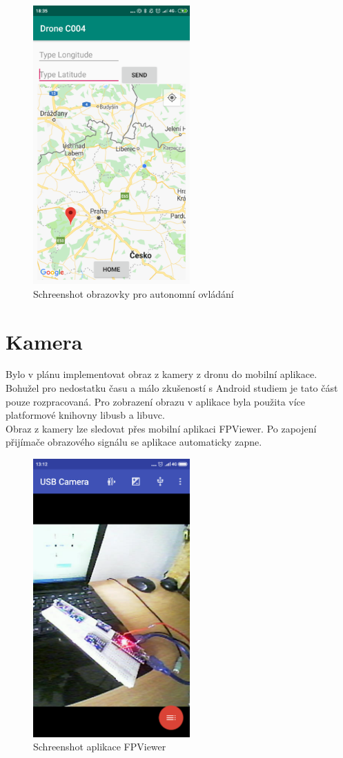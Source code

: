 \begin{figure}[h]
	\centering
	\includegraphics[width=6cm]{pictures/app2.png}
	\caption{Schreenshot obrazovky pro autonomní ovládání}
\end{figure}

\section{Kamera}
Bylo v plánu implementovat obraz z kamery z dronu do mobilní aplikace. Bohužel pro nedostatku času a málo zkušeností s Android studiem je tato část pouze rozpracovaná. Pro zobrazení obrazu v aplikace byla použita více platformové knihovny libusb a libuvc.\\
Obraz z kamery lze sledovat přes mobilní aplikaci FPViewer. Po zapojení přijímače obrazového signálu se aplikace automaticky zapne.\\

\begin{figure}[h]
	\centering
	\includegraphics[width=6cm]{pictures/fpvscreenshot.png}
	\caption{Schreenshot aplikace FPViewer}
\end{figure}

